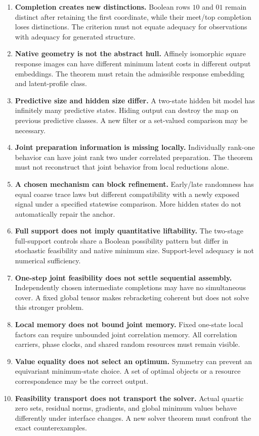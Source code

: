 \documentclass[11pt]{article}
\theoremstyle{remark}
\begin{document}
\begin{enumerate}
\item \textbf{Completion creates new distinctions.} Boolean rows $10$ and $01$ remain distinct after retaining the first coordinate, while their meet/top completion loses distinctions. The criterion must not equate adequacy for observations with adequacy for generated structure.
\item \textbf{Native geometry is not the abstract hull.} Affinely isomorphic square response images can have different minimum latent costs in different output embeddings. The theorem must retain the admissible response embedding and latent-profile class.
\item \textbf{Predictive size and hidden size differ.} A two-state hidden bit model has infinitely many predictive states. Hiding output can destroy the map on previous predictive classes. A new filter or a set-valued comparison may be necessary.
\item \textbf{Joint preparation information is missing locally.} Individually rank-one behavior can have joint rank two under correlated preparation. The theorem must not reconstruct that joint behavior from local reductions alone.
\item \textbf{A chosen mechanism can block refinement.} Early/late randomness has equal coarse trace laws but different compatibility with a newly exposed signal under a specified statewise comparison. More hidden states do not automatically repair the anchor.
\item \textbf{Full support does not imply quantitative liftability.} The two-stage full-support controls share a Boolean possibility pattern but differ in stochastic feasibility and native minimum size. Support-level adequacy is not numerical sufficiency.
\item \textbf{One-step joint feasibility does not settle sequential assembly.} Independently chosen intermediate completions may have no simultaneous cover. A fixed global tensor makes rebracketing coherent but does not solve this stronger problem.
\item \textbf{Local memory does not bound joint memory.} Fixed one-state local factors can require unbounded joint correlation memory. All correlation carriers, phase clocks, and shared random resources must remain visible.
\item \textbf{Value equality does not select an optimum.} Symmetry can prevent an equivariant minimum-state choice. A set of optimal objects or a resource correspondence may be the correct output.
\item \textbf{Feasibility transport does not transport the solver.} Actual quartic zero sets, residual norms, gradients, and global minimum values behave differently under interface changes. A new solver theorem must confront the exact counterexamples.

\end{enumerate}
\end{document}
